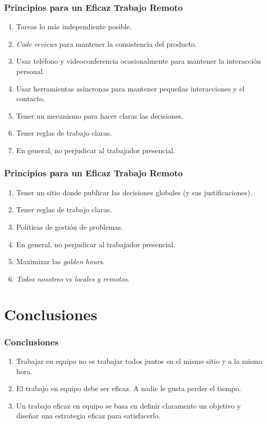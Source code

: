 \documentclass[handout,a4paper,slidestop,xcolor=pst,dvips,blue]{beamer}
\begin{document}
\begin{frame}[c]
	\frametitle{Principios para un Eficaz Trabajo Remoto}
	\begin{enumerate}[<+->]
        \item Tareas lo más independiente posible.
        \item \emph{Code reviews} para mantener la consistencia del producto.
        \item Usar teléfono y videoconferencia ocasionalmente para mantener la interacción personal.
        \item Usar herramientas asíncronas para mantener pequeñas interacciones y el contacto.
        \item Tener un mecanismo para hacer claras las decisiones.
        \item Tener reglas de trabajo claras. 
        \item En general, no perjudicar al trabajador presencial.
	\end{enumerate}
\end{frame}

\begin{frame}[c]
	\frametitle{Principios para un Eficaz Trabajo Remoto}
	\begin{enumerate}[<+->]
        \item Tener un sitio donde publicar las decisiones globales (y sus justificaciones).
        \item Tener reglas de trabajo claras.
        \item Políticas de gestión de problemas.
        \item En general, no perjudicar al trabajador presencial.
        \item Maximizar las \emph{golden hours}.
        \item \emph{Todos nosotros} vs \emph{locales y remotos}.
	\end{enumerate}
\end{frame}




\section{Conclusiones}

\begin{frame}[c]
	\frametitle{Conclusiones}
	\begin{enumerate}[<+->]
		\item Trabajar en equipo no es trabajar todos juntos en el mismo sitio y a la misma hora.
		\item El trabajo en equipo debe ser eficaz. A nadie le gusta perder el tiempo.
		\item Un trabajo eficaz en equipo se basa en definir claramente un objetivo y diseñar una estrategia eficaz para satisfacerlo.
	\end{enumerate}
\end{frame}
\end{document}
